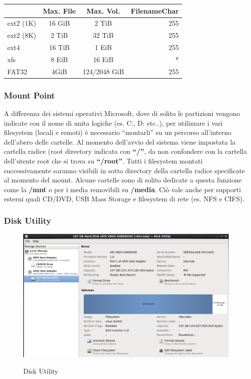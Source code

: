 \begin{center}
\begin{tabular}{|l|ccr|}
\hline
 & Max. File & Max. Vol.  & FilenameChar \\
\hline
ext2 (1K) & 16 GiB & 2 TiB & 255 \\
ext2 (8K) & 2 TiB & 32 TiB & 255 \\
ext4 & 16 TiB & 1 EiB & 255 \\
xfs & 8 EiB & 16 EiB & *\\
FAT32 & 4GiB & 124/2048 GiB & 255 \\
\hline
\end{tabular}
\end{center}



\subsubsection{Mount Point}

A differenza dei sistemi operativi Microsoft\textregistered, dove di solito le partizioni vengono indicate con il nome di unita logiche (es. C:, D: etc..), per utilizzare i vari filesystem (locali e remoti) è necessario ``montarli'' su un percorso all'interno dell'abero delle cartelle. 
Al momento dell'avvio del sistema viene impostata la cartella radice (root directory indicata con \textbf{``/''}, da non confondere con la cartella dell'utente root che si trova su \textbf{``/root''}.
Tutti i filesystem montati successivamente saranno visibili in sotto directory della cartella radice specificate al momento del mount. Alcune cartelle sono di solito dedicate a questa funzione come la \textbf{/mnt} o per i media removibili su \textbf{/media}. Ciò vale anche per supporti esterni quali CD/DVD, USB Mass Storage e filesystem di rete (es. NFS e CIFS).


\subsubsection{Disk Utility}

\begin{figure}[!ht]
 \centering
 \includegraphics[scale=0.4]{Immagini/Disk_Utility1.png}
 \label{fig:DiskUtility}
 \caption{Disk Utility}
\end{figure}

